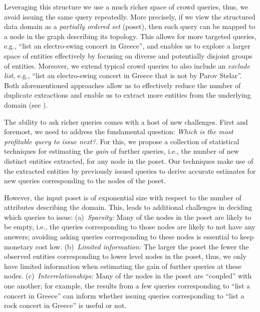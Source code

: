Leveraging this structure we use a much richer space of crowd queries, thus, we avoid issuing the same query repeatedly. More precisely, if we view the structured data domain as a \emph{partially ordered set} (poset), then each query can be mapped to a node in the graph describing its topology. This allows for more targeted queries, e.g., ``list an electro-swing concert in Greece'', and enables us to explore a larger space of entities effectively by focusing on diverse and potentially disjoint groups of entities. Moreover, we extend typical crowd queries to also include an {\em exclude list}, e.g., ``list an electro-swing concert in Greece that is not by Parov Stelar''. Both aforementioned approaches allow us to effectively reduce the number of duplicate extractions and enable us to extract more entities from the underlying domain (see ).

The ability to ask richer queries comes with a host of new challenges. First and foremost, we need to address the fundamental question: {\em Which is the most profitable query to issue next?}. For this, we propose a collection of  statistical techniques for estimating the {\em gain} of further queries, i.e., the number of new distinct entities extracted, for any node in the poset. Our techniques make use of the extracted entities by previously issued queries to derive accurate estimates for new queries corresponding to the nodes of the poset.  

However, the input poset is of exponential size with respect to the number of attributes describing the domain. This, leads to additional challenges in deciding which queries to issue: (a)~{\em Sparsity:} Many of the nodes in the poset are likely to be empty, i.e., the queries corresponding to those nodes are likely to not have any answers; avoiding asking queries corresponding to these nodes is essential to keep monetary cost low. (b)~{\em Limited information:} The larger the poset the fewer the observed entities corresponding to lower level nodes in the poset, thus, we only have limited information when estimating the gain of further queries at these nodes.  (c)~{\em Interrelationships:} Many of the nodes in the poset are ``coupled'' with one another; for example, the results from a few queries corresponding to ``list a concert in Greece'' can inform whether issuing queries corresponding to ``list a rock concert in Greece'' is useful or not. 

